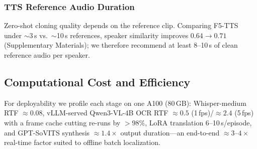 \documentclass[mathematics,article,submit,xetex,moreauthors]{Definitions/mdpi}
\begin{document}
\begin{table}[H]
\centering
\caption{Per-fold BLEU on held-out validation episodes (5-fold CV, \texttt{strip\_nums}\,+\,\allowbreak\texttt{ja-mecab}, $n$\,=\,16/16/16/16/15). For each fold and for the mean, the best BLEU across all models (Gemma-4-12B FT) is in bold. FT+V denotes Qwen3-VL-4B fine-tuned with video frames as additional input. Qwen3-VL-4B text FT$>$ZS on Folds 0, 1, 3; ZS wins on Folds 2 and 4 (highest OOV). Gemma-4-12B FT$>$ZS on all five folds; Qwen3-8B FT$>$ZS on Folds 0, 1, 3, 4.}
\label{tab:per_fold}
\end{table}

\subsubsection{TTS Reference Audio Duration}
\label{sec:ablation_tts}
Zero-shot cloning quality depends on the reference clip.
Comparing F5-TTS under $\sim$3\,s vs.\ $\sim$10\,s references, speaker similarity improves $0.64\to0.71$ (Supplementary Materials); we therefore recommend at least 8--10\,s of clean reference audio per speaker.

\subsection{Computational Cost and Efficiency}
For deployability we profile each stage on one A100 (80\,GB): Whisper-medium RTF $\approx0.08$, vLLM-served Qwen3-VL-4B OCR RTF $\approx0.5$ (1\,fps)/$\approx2.4$ (5\,fps) with a frame cache cutting re-runs by ${>}98\%$, LoRA translation 6--10\,s/episode, and GPT-SoVITS synthesis $\approx1.4\times$ output duration---an end-to-end $\approx3$--$4\times$ real-time factor suited to offline batch localization.
\end{document}
